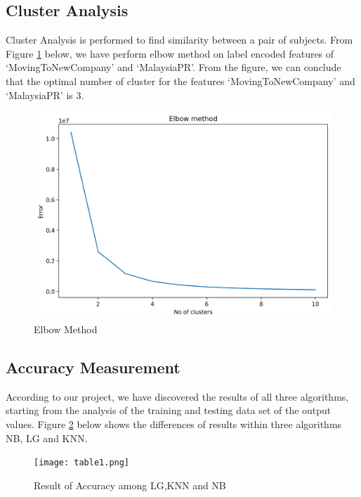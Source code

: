 \documentclass[11pt]{article}
\begin{document}
\subsection{Cluster Analysis}

\hspace{0.5cm} 
Cluster Analysis is performed to find similarity between a pair of subjects. From Figure \ref{fig:elbowm.jpg} below, we have perform elbow method on label encoded features of `MovingToNewCompany' and `MalaysiaPR'. From the figure, we can conclude that the optimal number of cluster for the features `MovingToNewCompany' and `MalaysiaPR' is 3.

\begin{figure}[H] 
     \centering
     \includegraphics[width=1.0\textwidth]{elbowm.jpg}
     \caption{Elbow Method}
     \label{fig:elbowm.jpg}
 \end{figure}
\vspace{0.3cm}

\subsection{Accuracy Measurement}

\hspace{0.5cm}
According to our project, we have discovered the results of all three algorithms, starting from the analysis of the training and testing data set of the output values. Figure \ref{fig:Table.jpg} below shows the differences of results within three algorithms NB, LG and KNN.

\begin{figure}[H]
     \centering
     \texttt{[image: table1.png]}
     \caption{Result of Accuracy among LG,KNN and NB}
     \label{fig:Table.jpg}  
\end{figure}
 
\end{document}
